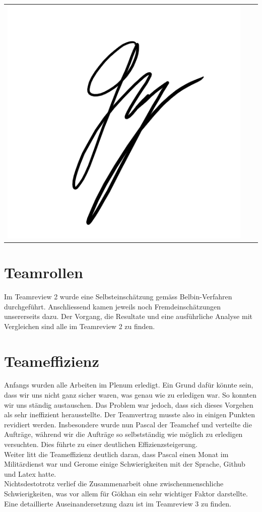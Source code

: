 \begin{tabular}{p{4cm}p{5cm}p{5.5cm}}
\includegraphics[scale=0.6]{img/unterschriftGoekhan}
\end{tabular}

\section{Teamrollen}

Im Teamreview 2 wurde eine Selbsteinschätzung gemäss Belbin-Verfahren durchgeführt. Anschliessend kamen jeweils noch Fremdeinschätzungen unsererseits dazu. Der Vorgang, die Resultate und eine ausführliche Analyse mit Vergleichen sind alle im Teamreview 2 zu finden. 

\section{Teameffizienz}

Anfangs wurden alle Arbeiten im Plenum erledigt. Ein Grund dafür könnte sein, dass wir uns nicht ganz sicher waren, was genau wie zu erledigen war. So konnten wir uns ständig austauschen. Das Problem war jedoch, dass sich dieses Vorgehen als sehr ineffizient herausstellte. Der Teamvertrag musste also in einigen Punkten revidiert werden. Insbesondere wurde nun Pascal der Teamchef und verteilte die Aufträge, während wir die Aufträge so selbstständig wie möglich zu erledigen versuchten. Dies führte zu einer deutlichen Effizienzsteigerung. \\
Weiter litt die Teameffizienz deutlich daran, dass Pascal einen Monat im Militärdienst war und Gerome einige Schwierigkeiten mit der Sprache, Github und Latex hatte. \\
Nichtsdestotrotz verlief die Zusammenarbeit ohne zwischenmenschliche Schwierigkeiten, was vor allem für Gökhan ein sehr wichtiger Faktor darstellte.  \\
Eine detaillierte Auseinandersetzung dazu ist im Teamreview 3 zu finden.  
